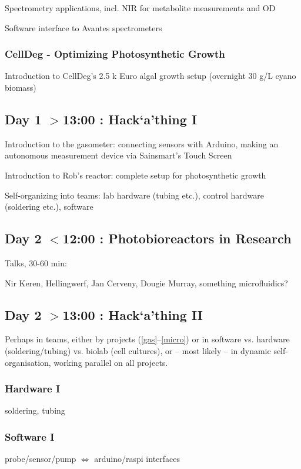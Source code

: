 \documentclass[12pt,a4paper]{scrartcl}
\begin{document}
Spectrometry applications, incl. NIR for metabolite measurements and OD

Software interface to Avantes spectrometers

\subsubsection{CellDeg - Optimizing Photosynthetic Growth}

Introduction to CellDeg's 2.5 k Euro algal growth setup (overnight 30 g/L
cyano biomass)

\subsection{Day 1 $>$13:00 : Hack`a'thing I}

Introduction to the gasometer: connecting sensors with Arduino,
making an autonomous measurement device via Sainsmart's Touch Screen

Introduction to Rob's reactor: complete setup for photosynthetic growth

Self-organizing into teams: lab hardware (tubing etc.), control hardware
(soldering etc.), software

\subsection{Day 2 $<$12:00 : Photobioreactors in Research}

Talks, 30-60 min:

Nir Keren, Hellingwerf, Jan Cerveny, Dougie Murray,
something microfluidics?

\subsection{Day 2 $>$13:00 : Hack`a'thing II}

Perhaps in teams, either by projects (\ref{gas}--\ref{micro}) or in
software vs. hardware (soldering/tubing) vs. biolab (cell cultures),
or -- most likely -- in dynamic self-organisation, working parallel on
all projects.

\subsubsection{Hardware I} 
soldering, tubing

\subsubsection{Software I} 
probe/sensor/pump $\Leftrightarrow$ arduino/raspi interfaces
\end{document}
